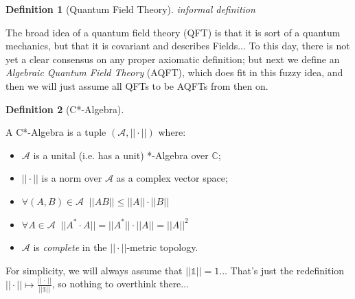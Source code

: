 \documentclass[a4paper,11pt]{article}
\numberwithin{equation}{section}
\theoremstyle{definition}
\newtheorem{definition}{Definition}
\newtheorem{comment}{Comment}
\begin{document}
\begin{definition}[Quantum Field Theory] \emph{informal definition}

    The broad idea of a quantum field theory (QFT) is that it is sort of a quantum mechanics, but that it is covariant and describes Fields...
    To this day, there is not yet a clear consensus on any proper axiomatic definition; but next we define an \emph{Algebraic Quantum Field Theory} (AQFT), which does fit in this fuzzy idea, and then we will just assume all QFTs to be AQFTs from then on.
\end{definition}
\begin{definition}[C*-Algebra]
    $\quad$
    
    A C*-Algebra is a tuple $(\mathcal{A}, ||\cdot||)$ where:
    \begin{itemize}
        \item $\mathcal{A}$ is a unital (i.e. has a unit) *-Algebra over $\mathbb{C}$;
        \item $||\cdot||$ is a norm over $\mathcal{A}$ as a complex vector space;
        \item $\forall (A,B)\in\mathcal{A}\;\; ||AB||\leq||A||\cdot||B||$
        \item $\forall A\in\mathcal{A}\;\; ||A^*\cdot A||=||A^*||\cdot||A||=||A||^2$
        \item $\mathcal{A}$ is \emph{complete} in the $||\cdot||$-metric topology.
    \end{itemize} 
    
For simplicity, we will always assume that $||\mathds{1}||=1$... That's just the redefinition $||\cdot||\mapsto\frac{||\,\cdot\,||}{||\mathds{1}||}$, so nothing to overthink there...
\end{definition}

\end{document}
